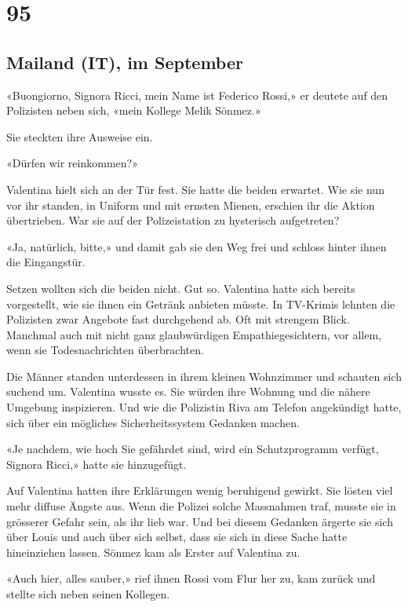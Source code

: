 \chapter{95}

\section{Mailand (IT), im 
September}



«Buongiorno, Signora Ricci, mein Name ist Federico Rossi,» er deutete
auf den Polizisten neben sich, «mein Kollege Melik Sönmez.»

Sie steckten ihre Ausweise ein.

«Dürfen wir reinkommen?»

Valentina hielt sich an der Tür fest. Sie hatte die beiden erwartet. Wie
sie nun vor ihr standen, in Uniform und mit ernsten Mienen, erschien ihr
die Aktion übertrieben. War sie auf der Polizeistation zu hysterisch
aufgetreten?

«Ja, natürlich, bitte,» und damit gab sie den Weg frei und schloss
hinter ihnen die Eingangstür.

Setzen wollten sich die beiden nicht. Gut so. Valentina hatte sich
bereits vorgestellt, wie sie ihnen ein Getränk anbieten müsste. In
TV-Krimis lehnten die Polizisten zwar Angebote fast durchgehend ab. Oft
mit strengem Blick. Manchmal auch mit nicht ganz glaubwürdigen
Empathiegesichtern, vor allem, wenn sie Todesnachrichten überbrachten.

Die Männer standen unterdessen in ihrem kleinen Wohnzimmer und schauten
sich suchend um. Valentina wusste es. Sie würden ihre Wohnung und die
nähere Umgebung inspizieren. Und wie die Polizistin Riva am Telefon
angekündigt hatte, sich über ein mögliches Sicherheitssystem Gedanken
machen.

«Je nachdem, wie hoch Sie gefährdet sind, wird ein Schutzprogramm
verfügt, Signora Ricci,» hatte sie hinzugefügt.

Auf Valentina hatten ihre Erklärungen wenig beruhigend gewirkt. Sie
lösten viel mehr diffuse Ängste aus. Wenn die Polizei solche Massnahmen
traf, musste sie in grösserer Gefahr sein, als ihr lieb war. Und bei
diesem Gedanken ärgerte sie sich über Louis und auch über sich selbst,
dass sie sich in diese Sache hatte hineinziehen lassen.
Sönmez kam als Erster auf Valentina zu.

«Auch hier, alles sauber,» rief ihnen Rossi vom Flur her zu, kam zurück
und stellte sich neben seinen Kollegen.

